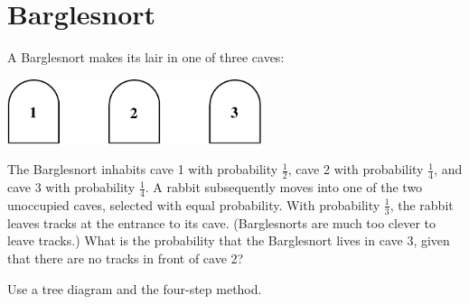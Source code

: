 \documentclass[12pt]{article}
\begin{document}

\newpage

\section{Barglesnort}
A Barglesnort makes its lair in one of three caves:
%
\begin{center}
\includegraphics[height=0.75in]{caves}
\end{center}
%
The Barglesnort inhabits cave 1 with probability $\frac{1}{2}$, cave 2
with probability $\frac{1}{4}$, and cave 3 with probability
$\frac{1}{4}$.  A rabbit subsequently moves into one of the two
unoccupied caves, selected with equal probability.  With probability
$\frac{1}{3}$, the rabbit leaves tracks at the entrance to its cave.
(Barglesnorts are much too clever to leave tracks.)  What is the
probability that the Barglesnort lives in cave 3, given that there are
no tracks in front of cave 2?

Use a tree diagram and the four-step method.

\end{document}
